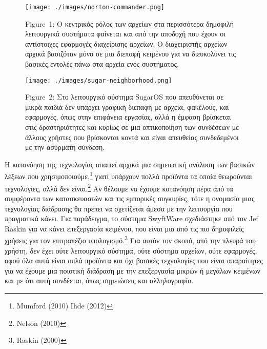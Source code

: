 \documentclass[
]{article}
\begin{document}
\leavevmode{}%
\begin{figure}
\hypertarget{fig:norton-commander}{%
\centering
\texttt{[image: ./images/norton-commander.png]}
\caption{Figure~1: Ο κεντρικός ρόλος των αρχείων στα περισσότερα
δημοφιλή λειτουργικά συστήματα φαίνεται και από την αποδοχή που έχουν οι
αντίστοιχες εφαρμογές διαχείρισης αρχείων. Ο διαχειριστής αρχείων αρχικά
βασιζόταν μόνο σε μια διεπαφή κειμένου για να διευκολύνει τις βασικές
εντολές πάνω στα αρχεία ενός συστήματος.}\label{fig:norton-commander}
}
\end{figure}

\leavevmode{}%
\begin{figure}
\hypertarget{fig:sugar-neighborhood}{%
\centering
\texttt{[image: ./images/sugar-neighborhood.png]}
\caption{Figure~2: Στο λειτουργικό σύστημα SugarOS που απευθύνεται σε
μικρά παιδιά δεν υπάρχει γραφική διεπαφή με αρχεία, φακέλους, και
εφαρμογές, όπως στην επιφάνεια εργασίας, αλλά η έμφαση βρίσκεται στις
δραστηριότητες και κυρίως σε μια οπτικοποίηση των συνδέσεων με άλλους
χρήστες που βρίσκονται κοντά και είναι απευθείας συνδεδεμένοι με την
ασύρματη σύνδεση.}\label{fig:sugar-neighborhood}
}
\end{figure}

Η κατανόηση της τεχνολογίας απαιτεί αρχικά μια σημειωτική ανάλυση των
βασικών λέξεων που χρησιμοποιούμε,\footnote{Mumford (2010) Ihde (2012)}
γιατί υπάρχουν πολλά προϊόντα τα οποία θεωρούνται τεχνολογίες, αλλά δεν
είναι.\footnote{Nelson (2010)} Αν θέλουμε να έχουμε κατανόηση πέρα από
τα συμφέροντα των κατασκευαστών και τις εμπορικές συγκυρίες, τότε η
ονομασία μιας τεχνολογίας διάδρασης θα πρέπει να σχετίζεται άμεσα με την
λειτουργία που πραγματικά κάνει. Για παράδειγμα, το σύστημα SwyftWare
σχεδιάστηκε από τον Jef Raskin για να κάνει επεξεργασία κειμένου, που
είναι μια από τις πιο δημοφιλείς χρήσεις για τον επιτραπέζιο
υπολογισμό.\footnote{Raskin (2000)} Για αυτόν τον σκοπό, από την πλευρά
του χρήστη, δεν έχει ούτε λειτουργικό σύστημα, ούτε σύστημα αρχείων,
ούτε εφαρμογές, αφού όλα αυτά είναι απλά προϊόντα και όχι βασικές
τεχνολογίες που είναι απαραίτητες για να έχουμε μια ποιοτική διάδραση με
την επεξεργασία μικρών ή μεγάλων κειμένων και με ότι αυτή συνδέεται,
όπως σημειώσεις και αλληλογραφία.
\end{document}
